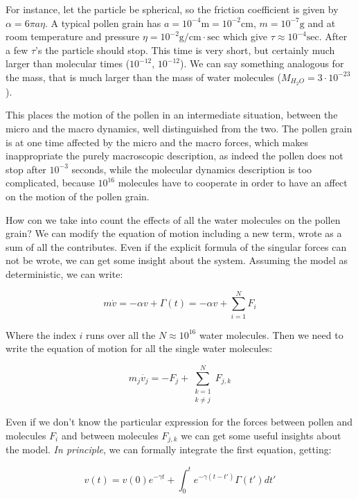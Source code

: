 \documentclass{article}
\begin{document}
For instance, let the particle be spherical, so the friction coefficient is given by $\alpha = 6 \pi a \eta $. A typical pollen grain has $a = 10^{-4}\mathrm{m}=10^{-2}\mathrm{cm}$, $m= 10^{-7}\mathrm{g}$ and at room temperature and pressure $\eta=10^{-2}\mathrm{ g/{cm \cdot sec}}$ which give $\tau \approx 10^{-4}\mathrm{sec}$. After a few $\tau$'s the particle should stop. This time is very short, but certainly much larger than molecular times ($10^{-12}$, $10^{-12}$). We can say something analogous for the mass, that is much larger than the mass of water molecules ($M_{H_{2}O}=3\cdot 10^{-23}$).

This places the motion of the pollen in an intermediate situation, between the micro and the macro dynamics, well distinguished from the two. The pollen grain is at one time affected by the micro and the macro forces, which makes inappropriate the purely macroscopic description, as indeed the pollen does not stop after $10^{-3}$ seconds, while the molecular dynamics description is too complicated, because $10^{16}$ molecules have to cooperate in order to have an affect on the motion of the pollen grain. 

How con we take into count the effects of all the water molecules on the pollen grain? We can modify the equation of motion including a new term, wrote as a sum of all the contributes. Even if the explicit formula of the singular forces can not be wrote, we can get some insight about the system. Assuming the model as deterministic, we can write:

\begin{equation}
m \dot{v} =  - \alpha v + \Gamma(t) =  - \alpha v + \sum_{i=1}^{N} F_{i}
\end{equation}

Where the index $i$ runs over all the $N \approx 10^{16}$ water molecules. Then we need to write the equation of motion for all the single water molecules:

\begin{equation}
m_j \dot{v_j} = - F_j +  \sum_{ \substack{k=1 \\ k \neq j }}^{N} F_{j,k}
\end{equation}

Even if we don't know the particular expression for the forces between pollen and molecules $F_i$ and between molecules $F_{j,k}$ we can get some useful insights about the model. \textit{In principle}, we can formally integrate the first equation, getting:

\begin{equation}
v(t) = v(0) e^{-\gamma t} + \int_{0}^{t} e^{- \gamma (t-t')} \Gamma(t') dt'
\end{equation} 
\end{document}
